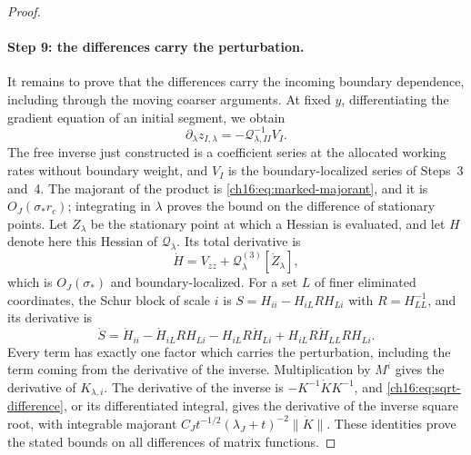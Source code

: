 \begin{proof}
\paragraph{Step 9: the differences carry the perturbation.}
It remains to prove that the differences carry the incoming boundary dependence, including through the moving coarser arguments. At fixed $y$, differentiating the gradient equation of an initial segment, we obtain
\begin{equation}\label{ch16:eq:perturbed-center-response}
 \partial_\lambda z_{I,\lambda}
                 =-\mathcal Q_{\lambda,II}^{-1}V_I.
\end{equation}
The free inverse just constructed is a coefficient series at the allocated working rates without boundary weight, and $V_I$ is the boundary-localized series of Steps~3 and~4. The majorant of the product is \eqref{ch16:eq:marked-majorant}, and it is $O_J(\sigma_*r_c)$; integrating in $\lambda$ proves the bound on the difference of stationary points. Let $Z_\lambda$ be the stationary point at which a Hessian is evaluated, and let $H$ denote here this Hessian of $\mathcal Q_\lambda$. Its total derivative is
\[
 \dot H=V_{zz}+\mathcal Q_\lambda^{(3)}[\dot Z_\lambda],
\]
which is $O_J(\sigma_*)$ and boundary-localized. For a set $L$ of finer eliminated coordinates, the Schur block of scale $i$ is $S=H_{ii}-H_{iL}RH_{Li}$ with $R=H_{LL}^{-1}$, and its derivative is
\begin{equation}\label{ch16:eq:schur-response}
 \dot S=\dot H_{ii}-\dot H_{iL}RH_{Li}-H_{iL}R\dot H_{Li}
                         +H_{iL}R\dot H_{LL}RH_{Li}.
\end{equation}
Every term has exactly one factor which carries the perturbation, including the term coming from the derivative of the inverse. Multiplication by $M^i$ gives the derivative of $K_{\lambda,i}$. The derivative of the inverse is $-K^{-1}\dot KK^{-1}$, and \eqref{ch16:eq:sqrt-difference}, or its differentiated integral, gives the derivative of the inverse square root, with integrable majorant $C_Jt^{-1/2}(\lambda_J+t)^{-2}\|\dot K\|$. These identities prove the stated bounds on all differences of matrix functions.


\end{proof}
